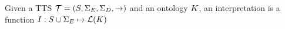 

\begin{definition}
\label{def:interpretation}
Given a TTS $\mathcal{T} = (S, \Sigma_E, \Sigma_D, \rightarrow)$ and an ontology $K $, an interpretation is a function $I : S \cup \Sigma_E \mapsto \mathcal{L}(K)$ 
\end{definition}



